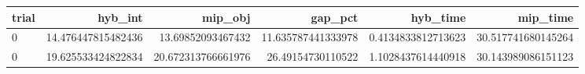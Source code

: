 \begin{tabular}{lrrrrr}
\hline
trial & hyb_int & mip_obj & gap_pct & hyb_time & mip_time \\ \hline
0 & 14.476447815482436 & 13.69852093467432 & 11.635787441333978 & 0.4134833812713623 & 30.517741680145264 \\
0 & 19.625533424822834 & 20.672313766661976 & 26.49154730110522 & 1.1028437614440918 & 30.143989086151123 \\
\hline
\end{tabular}
